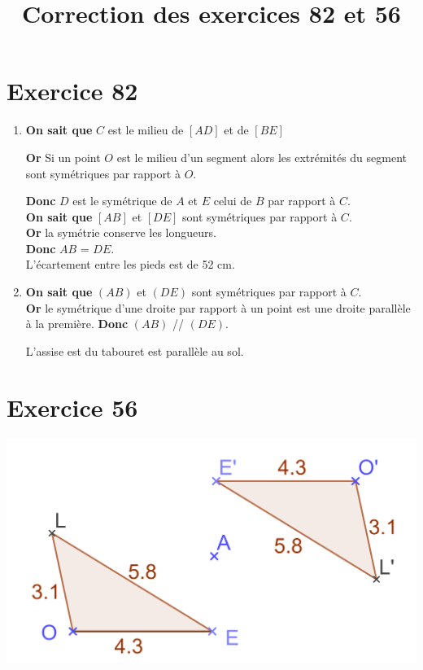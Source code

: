 \documentclass[12pt,a4paper]{article}
\title{Correction des exercices 82 et 56}
\date{}
\begin{document}
	
	\maketitle
	
	\section*{Exercice 82}
	\begin{enumerate}[label=\arabic*)]
		\item \textbf{On sait que} $C$ est le milieu de $[AD]$ et de $[BE]$
		
		\textbf{Or} Si un point $O$ est le milieu d'un segment alors les extrémités du segment sont symétriques par rapport à $O$.
		
		\textbf{Donc} $D$ est le symétrique de $A$ et $E$ celui de $B$ par rapport à $C$.\\
		
		\textbf{On sait que} $[AB]$ et $[DE]$ sont symétriques par rapport à $C$.\\
		\textbf{Or} la symétrie conserve les longueurs.\\
		\textbf{Donc} $AB$ = $DE$.\\
		
		L'écartement entre les pieds est de 52 cm.
		
		\item 
		\textbf{On sait que} $(AB)$ et $(DE)$ sont symétriques par rapport à $C$.\\
		\textbf{Or} le symétrique d'une droite par rapport à un point est une droite parallèle à la première.
		\textbf{Donc} $(AB)$ // $(DE)$.
		
		L'assise est du tabouret est parallèle au sol.
	\end{enumerate}

	\section*{Exercice 56}
	
	\begin{center}
		\includegraphics[scale=0.2]{ex56}
	\end{center}
\end{document}
